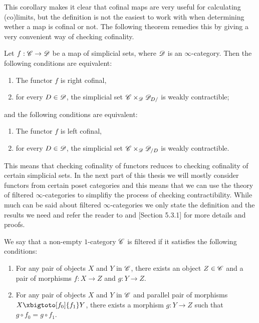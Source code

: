 \documentclass[../../thesis.tex]{subfiles}
\begin{document}
This corollary makes it clear that cofinal maps are very useful for calculating (co)limits, but the definition is not the easiest to work with when determining wether a map is cofinal or not.
The following theorem remedies this by giving a very convenient way of checking cofinality.
\begin{theorem}{\cite[\href{https://kerodon.net/tag/02NY}{Theorem 02NY}]{kerodon}\label{superlemma}}
    Let \(f: \mathscr{C} \to \mathscr{D}\) be a map of simplicial sets, where $\mathscr{D}$ is an $\infty$-category.
    Then the following conditions are equivalent:
    \begin{enumerate}
        \item The functor $f$ is right cofinal,
        \item for every $D\in \mathscr{D}$, the simplicial set $\mathscr{C}\times_{\mathscr{D}} \mathscr{D}_{D/}$ is weakly contractible;
    \end{enumerate}
    and the following conditions are equivalent:
    \begin{enumerate}
        \item The functor $f$ is left cofinal,
        \item for every $D\in \mathscr{D}$, the simplicial set $\mathscr{C}\times_{\mathscr{D}} \mathscr{D}_{/D}$ is weakly contractible.
    \end{enumerate}
\end{theorem}
This means that checking cofinality of functors reduces to checking cofinality of certain simplicial sets.
In the next part of this thesis we will mostly consider functors from certain poset categories and this means that we can use the theory of filtered $\infty$-categories to simplifiy the process of checking contractibility.
While much can be said about filtered $\infty$-categories we only state the definition and the results we need and refer the reader to \cite[\href{https://kerodon.net/tag/02P8}{Subsection 02P8}]{kerodon} and \cite{HTT}[Section 5.3.1] for more details and proofs.
\begin{definition}
    We say that a non-empty $1$-category $\mathscr{C}$ is filtered if it satisfies the following conditions:
    \begin{enumerate}
        \item For any pair of objects $X$ and $Y$ in $\mathscr{C}$, there exists an object $Z \in \mathscr{C}$ and a pair of morphisms $f : X\to Z$ and $g : Y\to Z$.
        \item For any pair of objects $X$ and $Y$ in $\mathscr{C}$ and parallel pair of morphisms $X \xbigtoto[f_0]{f_1} Y$, there exists a morphism $g : Y \to Z$ such that $g \circ f_0 = g \circ f_1$.
    \end{enumerate}
\end{definition}
\end{document}

